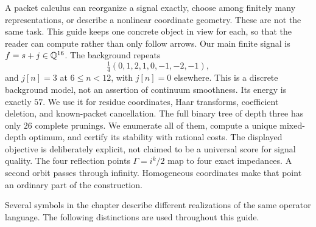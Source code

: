 A packet calculus can reorganize a signal exactly, choose among finitely many representations, or describe a nonlinear coordinate geometry. These are not the same task. This guide keeps one concrete object in view for each, so that the reader can compute rather than only follow arrows.
Our main finite signal is $f=s+j\in\mathbb Q^{16}$. The background repeats
\[
\tfrac14(0,1,2,1,0,-1,-2,-1),
\]
and $j[n]=3$ at $6\le n<12$, with $j[n]=0$ elsewhere. This is a discrete background model, not an assertion of continuum smoothness. Its energy is exactly $57$. We use it for residue coordinates, Haar transforms, coefficient deletion, and known-packet cancellation.
The full binary tree of depth three has only $26$ complete prunings. We enumerate all of them, compute a unique mixed-depth optimum, and certify its stability with rational costs. The displayed objective is deliberately explicit, not claimed to be a universal score for signal quality.
The four reflection points $\Gamma=i^k/2$ map to four exact impedances. A second orbit passes through infinity. Homogeneous coordinates make that point an ordinary part of the construction.

Several symbols in the chapter describe different realizations of the same operator language. The following distinctions are used throughout this guide.

